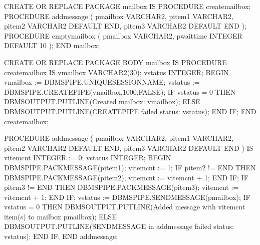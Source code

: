 \documentclass[letterpaper,10pt,english,openany,oneside]{sphinxmanual}
\begin{document}
%
\begin{sphinxVerbatim}[commandchars=\\\{\}]
CREATE OR REPLACE PACKAGE mailbox
IS
    PROCEDURE create\PYGZus{}mailbox;
    PROCEDURE add\PYGZus{}message (
        p\PYGZus{}mailbox   VARCHAR2,
        p\PYGZus{}item\PYGZus{}1    VARCHAR2,
        p\PYGZus{}item\PYGZus{}2    VARCHAR2 DEFAULT \PYGZsq{}END\PYGZsq{},
        p\PYGZus{}item\PYGZus{}3    VARCHAR2 DEFAULT \PYGZsq{}END\PYGZsq{}
    );
    PROCEDURE empty\PYGZus{}mailbox (
        p\PYGZus{}mailbox   VARCHAR2,
        p\PYGZus{}waittime  INTEGER DEFAULT 10
    );
END mailbox;

CREATE OR REPLACE PACKAGE BODY mailbox
IS
    PROCEDURE create\PYGZus{}mailbox
    IS
        v\PYGZus{}mailbox   VARCHAR2(30);
        v\PYGZus{}status    INTEGER;
    BEGIN
        v\PYGZus{}mailbox := DBMS\PYGZus{}PIPE.UNIQUE\PYGZus{}SESSION\PYGZus{}NAME;
        v\PYGZus{}status := DBMS\PYGZus{}PIPE.CREATE\PYGZus{}PIPE(v\PYGZus{}mailbox,1000,FALSE);
        IF v\PYGZus{}status = 0 THEN
            DBMS\PYGZus{}OUTPUT.PUT\PYGZus{}LINE(\PYGZsq{}Created mailbox: \PYGZsq{} \textbar{}\textbar{} v\PYGZus{}mailbox);
        ELSE
            DBMS\PYGZus{}OUTPUT.PUT\PYGZus{}LINE(\PYGZsq{}CREATE\PYGZus{}PIPE failed \PYGZhy{} status: \PYGZsq{} \textbar{}\textbar{}
                v\PYGZus{}status);
        END IF;
    END create\PYGZus{}mailbox;

    PROCEDURE add\PYGZus{}message (
        p\PYGZus{}mailbox   VARCHAR2,
        p\PYGZus{}item\PYGZus{}1    VARCHAR2,
        p\PYGZus{}item\PYGZus{}2    VARCHAR2 DEFAULT \PYGZsq{}END\PYGZsq{},
        p\PYGZus{}item\PYGZus{}3    VARCHAR2 DEFAULT \PYGZsq{}END\PYGZsq{}
    )
    IS
        v\PYGZus{}item\PYGZus{}cnt  INTEGER := 0;
        v\PYGZus{}status    INTEGER;
    BEGIN
        DBMS\PYGZus{}PIPE.PACK\PYGZus{}MESSAGE(p\PYGZus{}item\PYGZus{}1);
        v\PYGZus{}item\PYGZus{}cnt := 1;
        IF p\PYGZus{}item\PYGZus{}2 != \PYGZsq{}END\PYGZsq{} THEN
            DBMS\PYGZus{}PIPE.PACK\PYGZus{}MESSAGE(p\PYGZus{}item\PYGZus{}2);
            v\PYGZus{}item\PYGZus{}cnt := v\PYGZus{}item\PYGZus{}cnt + 1;
        END IF;
        IF p\PYGZus{}item\PYGZus{}3 != \PYGZsq{}END\PYGZsq{} THEN
            DBMS\PYGZus{}PIPE.PACK\PYGZus{}MESSAGE(p\PYGZus{}item\PYGZus{}3);
            v\PYGZus{}item\PYGZus{}cnt := v\PYGZus{}item\PYGZus{}cnt + 1;
        END IF;
        v\PYGZus{}status := DBMS\PYGZus{}PIPE.SEND\PYGZus{}MESSAGE(p\PYGZus{}mailbox);
        IF v\PYGZus{}status = 0 THEN
            DBMS\PYGZus{}OUTPUT.PUT\PYGZus{}LINE(\PYGZsq{}Added message with \PYGZsq{} \textbar{}\textbar{} v\PYGZus{}item\PYGZus{}cnt \textbar{}\textbar{}
                \PYGZsq{} item(s) to mailbox \PYGZsq{} \textbar{}\textbar{} p\PYGZus{}mailbox);
        ELSE
            DBMS\PYGZus{}OUTPUT.PUT\PYGZus{}LINE(\PYGZsq{}SEND\PYGZus{}MESSAGE in add\PYGZus{}message failed \PYGZhy{} \PYGZsq{} \textbar{}\textbar{}
                \PYGZsq{}status: \PYGZsq{} \textbar{}\textbar{} v\PYGZus{}status);
        END IF;
    END add\PYGZus{}message;


\end{sphinxVerbatim}
\end{document}
